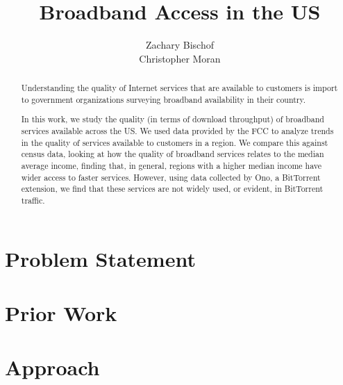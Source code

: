 \documentclass{sig-alternate-10pt}
\begin{document}
\title{Broadband Access in the US}
\author{
Zachary Bischof\\
Christopher Moran
}
  
\maketitle

\begin{abstract}
 
Understanding the quality of Internet services that are available to customers is
import to government organizations surveying broadband availability in their 
country.

In this work, we study the quality (in terms of download throughput) of
broadband services available across the US. We used data provided by the FCC to
analyze trends in the quality of services available to customers in a region.
We compare this against census data, looking at how the quality of broadband
services relates to the median average income, finding that, in general,
regions with a higher median income have wider access to faster services.
However, using data collected by Ono, a BitTorrent extension, we find that
these services are not widely used, or evident, in BitTorrent traffic.

\end{abstract}

\section{Problem Statement}
\label{sec:statement} 



\section{Prior Work}
\label{sec:prior-work}


 
\section{Approach}
\label{sec:approach} 
\end{document}
